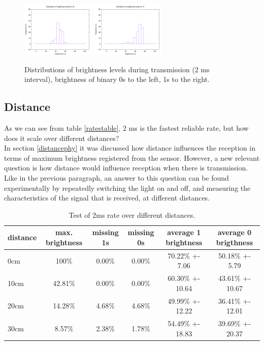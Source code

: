 \begin{figure}
\centering
\includegraphics[height=100px]{img/hist0}
\includegraphics[height=100px]{img/hist1}
\caption{Distributions of brightness levels during transmission (2 ms interval), brightness of binary 0s to the left, 1s to the right. }
\label{fig:histopeaks}
\end{figure}


\subsection{Distance}
As we can see from table \ref{ratestable}, 2 ms is the fastest reliable rate, but how does it scale over different distances?\\
In section \ref{distancephy} it was discussed how distance influences the reception in terms of maximum brightness registered from the sensor.
However, a new relevant question is how distance would influence reception when there is transmission.
Like in the previous paragraph, an answer to this question can be found experimentally by repeatedly switching the light on and off, and measuring the characteristics of the signal that is received, at different distances.
\begin{table}[hbt]
\centering
  \begin{tabular}{l c c c c c}
    distance & max. brightness & missing 1s & missing 0s & average 1 brightness & average 0 brigthness\\
    \hline
    0cm & 100\% & 0.00\% & 0.00\%  & 70.22\% +- 7.06 & 50.18\% +- 5.79 \\
    10cm & 42.81\% & 0.00\% & 0.00\%  & 60.30\% +- 10.64 & 43.61\% +- 10.67 \\
    20cm & 14.28\% & 4.68\% & 4.68\%  & 49.99\% +- 12.22 & 36.41\% +- 12.01 \\
    30cm & 8.57\% & 2.38\% & 1.78\%  &  54.49\% +- 18.83 & 39.69\% +- 20.37 \\
  \end{tabular}
  \caption{Test of 2ms rate over different distances.}
  \label{tab:2msdistances}
\end{table}

